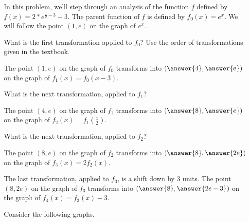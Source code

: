 \documentclass{ximera}
\author{Kenneth Berglund}
\begin{document}
In this problem, we'll step through an analysis of the function $f$ defined by $f(x) = 2 \ast e^{\frac{x}{2} - 3} - 3$. The parent function of $f$ is defined by $f_0(x) = e^x$. We will follow the point $(1, e)$ on the graph of $e^x$. 
\begin{exercise}
What is the first transformation applied to $f_0$? Use the order of transformations given in the textbook.
\begin{multipleChoice}
\end{multipleChoice}

\begin{exercise}
The point $(1, e)$ on the graph of $f_0$ transforms into $(\answer{4}, \answer{e})$ on the graph of $f_1(x) = f_0(x - 3)$. 

\begin{exercise}
What is the next transformation, applied to $f_1$?
\begin{multipleChoice}
\end{multipleChoice}

\begin{exercise}
The point $(4, e)$ on the graph of $f_1$ transforms into $(\answer{8}, \answer{e})$ on the graph of $f_2(x) = f_1\left(\frac{x}{2}\right)$. 

\begin{exercise}
What is the next transformation, applied to $f_2$?
\begin{multipleChoice}
\end{multipleChoice}

\begin{exercise}
The point $(8, e)$ on the graph of $f_2$ transforms into $(\answer{8}, \answer{2e})$ on the graph of $f_3(x) = 2f_2\left(x\right)$. 

\begin{exercise}
The last transformation, applied to $f_3$, is a shift down by 3 units. The point $(8, 2e)$ on the graph of $f_3$ transforms into $(\answer{8}, \answer{2e - 3})$ on the graph of $f_4(x) = f_3(x) - 3$. 

\begin{exercise}
Consider the following graphs.


\end{exercise}
\end{exercise}
\end{exercise}
\end{exercise}
\end{exercise}
\end{exercise}
\end{exercise}
\end{exercise}
\end{document}
